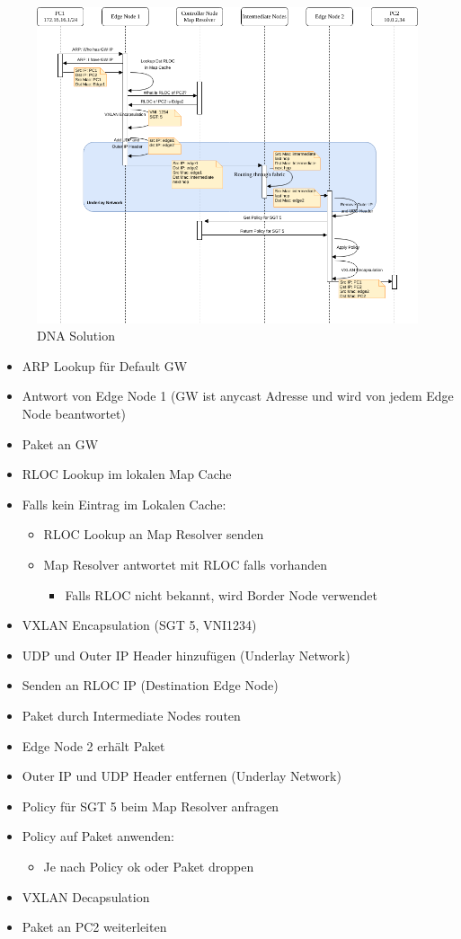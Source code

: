 \begin{figure}[H]
	\centering
	\includegraphics[width=16cm]{img/SDA_Mechanismus.png}
	\caption{DNA Solution}
	\label{fig:SDA Mechanismus}
\end{figure}
\begin{itemize}
	\item ARP Lookup für Default GW
	\item Antwort von Edge Node 1 (GW ist anycast Adresse und wird von jedem Edge Node beantwortet)
	\item Paket an GW
	\item RLOC Lookup im lokalen Map Cache
	\item Falls kein Eintrag im Lokalen Cache:
	\begin{itemize}
		\item RLOC Lookup an Map Resolver senden
		\item Map Resolver antwortet mit RLOC falls vorhanden
		\begin{itemize}
			\item Falls RLOC nicht bekannt, wird Border Node verwendet 
		\end{itemize} 
	\end{itemize}
	\item VXLAN Encapsulation (SGT 5, VNI1234)
	\item UDP und Outer IP Header hinzufügen (Underlay Network)
	\item Senden an RLOC IP (Destination Edge Node)
	\item Paket durch Intermediate Nodes routen
	\item Edge Node 2 erhält Paket
	\item Outer IP und UDP Header entfernen (Underlay Network)
	\item Policy für SGT 5 beim Map Resolver anfragen
	\item Policy auf Paket anwenden:
	\begin{itemize}
		\item Je nach Policy ok oder Paket droppen
	\end{itemize}
	\item VXLAN Decapsulation
	\item Paket an PC2 weiterleiten
\end{itemize}


